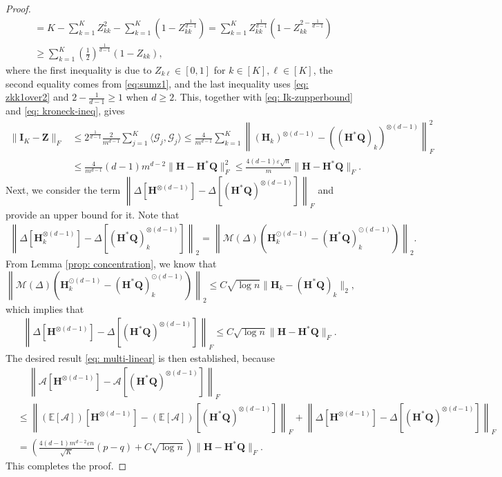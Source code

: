 \documentclass{article}
\theoremstyle{plain}
\theoremstyle{definition}
\theoremstyle{remark}
\newcommand{\BE}{\mathbb{E}}
\newcommand{\BH}{\bm{H}}
\newcommand{\BQ}{\bm{Q}}
\newcommand{\GCal}{\mathcal{G}}
\newcommand{\ACal}{\mathcal{A}}
\begin{document}
\begin{appendix}
\begin{center}
\begin{proof}
\begin{align}
				& =  K - \sum_{k=1}^K Z_{kk}^2  - \sum_{k=1}^K \left(1-Z_{kk}^{\frac{1}{d-1}} \right) = \sum_{k=1}^K Z_{kk}^{\frac{1}{d-1}}\left(1-Z_{kk}^{2-\frac{1}{d-1}}\right) \nonumber \\
				& \geq \sum_{k=1}^K\left( \frac{1}{2}\right)^\frac{1}{d-1} \left(1-Z_{kk} \right),
			\end{align}
			where the first inequality is due to $Z_{k\ell} \in [0,1]$ for $k\in[K], \ell \in [K]$, the second equality comes from \eqref{eq:sumz1}, and the last inequality uses \eqref{eq: zkk1over2} and $2-\frac{1}{d-1}\geq 1$ when $d \geq 2$. This, together with \eqref{eq: Ik-zupperbound} and \eqref{eq: kroneck-ineq}, gives
			\begin{align*}
				\| \bm{I}_K - \bm{Z}\|_F & \leq	2^{\frac{1}{d-1}}\frac{2}{m^{d-1}}\sum_{j=1}^K \langle \GCal_j, \GCal_j \rangle \leq \frac{4}{m^{d-1}} 	\sum_{k=1}^K \left\| (\BH_k)^{\otimes (d-1)} - ((\BH^* \BQ)_k)^{\otimes (d-1)} \right \|_F^2\\
				& \leq \frac{4}{m^{d-1}} (d-1)m^{d-2}\| \BH - \BH^* \BQ\|_F^2 \leq \frac{4(d-1)\varepsilon \sqrt{n}}{m} \| \BH - \BH^*\BQ\|_F.
			\end{align*}
			Next, we consider the term $\left \| \Delta \left[\bm{H}^{\otimes (d-1)}\right] - \Delta \left[(\bm{H}^*\bm{Q})^{\otimes (d-1)}\right] \right\|_F$ and provide an upper bound for it. Note that
			\begin{align}\label{eq: boundnoise}
				\left\| \Delta \left[\bm{H}_k^{\otimes (d-1)}\right] - \Delta \left[(\bm{H}^*\bm{Q})_k^{\otimes (d-1)}\right] \right\|_2 = \left\| \mathcal{M}(\Delta) \left(\bm{H}_k^{\odot (d-1)} - (\bm{H}^*\bm{Q})_k^{\odot (d-1)} \right) \right\|_2.
			\end{align}
			From Lemma \ref{prop: concentration}, we know that
			\begin{equation}
				\left\| \mathcal{M}(\Delta) \left(\bm{H}_k^{\odot (d-1)} - (\bm{H}^*\bm{Q})_k^{\odot (d-1)} \right) \right\|_2 \leq C \sqrt{\log n} \| \BH_k - (\BH^*\BQ)_k \|_2,
			\end{equation}
			which implies that
			\begin{align}
				\left \| \Delta \left[\bm{H}^{\otimes (d-1)}\right] - \Delta \left[(\bm{H}^*\bm{Q})^{\otimes (d-1)}\right] \right\|_F \leq C \sqrt{\log n} \|\bm{H} - \bm{H}^*\bm{Q}\|_F.
			\end{align}
			The desired result \eqref{eq: multi-linear} is then established, because 
			\begin{align*}
				& \quad\, \left\| \ACal\left[\bm{H}^{\otimes (d-1)}\right] - \ACal\left[ (\bm{H}^*\BQ)^{\otimes (d-1)}\right] \right\|_F \\
				& \leq  \left\| (\BE[\ACal] )\left[\bm{H}^{\otimes (d-1)}\right] - (\BE[\ACal] )\left[ (\bm{H}^*\BQ)^{\otimes (d-1)}\right] \right\|_F +  \left\| \Delta \left[\bm{H}^{\otimes (d-1)}\right] - \Delta \left[(\bm{H}^*\bm{Q})^{\otimes (d-1)}\right] \right\|_F \\
				& = \left(\frac{4(d-1)m^{d-2}\varepsilon n}{\sqrt{K}} (p-q) + C\sqrt{\log n} \right) \|\bm{H} - \bm{H}^*\bm{Q}\|_F.
			\end{align*}
   This completes the proof.
		\end{proof}

\end{center}
\end{appendix}
\end{document}
